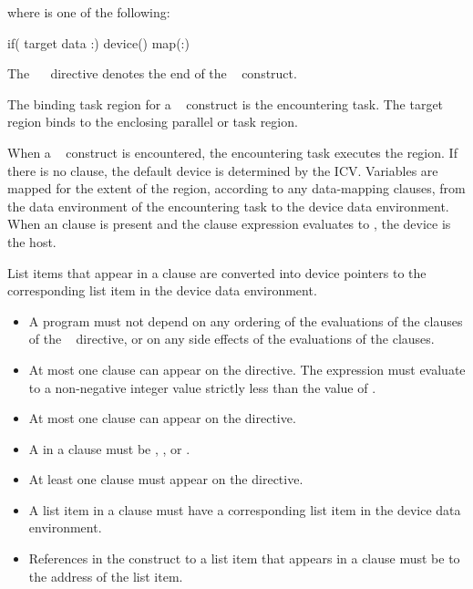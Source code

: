 where  is one of the following:

\begin{indentedcodelist}
if(\plc{[} target data :\plc{] scalar-logical-expression})
device()
map(\plc{[[map-type-modifier[,]] map-type}:\plc{ ] list})
\end{indentedcodelist}

The ~~ directive denotes the end of the ~ construct.
\fortranspecificend

\binding
The binding task region for a ~ construct is the encountering task. The 
target region binds to the enclosing parallel or task region.

\descr
When a ~ construct is encountered, the encountering task executes the region. If there is no  clause, the default device is determined by the  ICV. Variables are mapped for the extent of the region, according to any data-mapping clauses, from the data environment of the encountering task to the device data environment. When an  clause is present and the  clause expression evaluates to , the device is the host.

List items that appear in a  clause are converted into
device pointers to the corresponding list item in the device data environment.

\restrictions
\begin{itemize}
  \item A program must not depend on any ordering of the evaluations of the clauses of the
    ~ directive, or on any side effects of the evaluations of the clauses.

  \item At most one  clause can appear on the directive. The  expression
    must evaluate to a non-negative integer value strictly less than the value
    of .

  \item At most one  clause can appear on the directive.
  \item A  in a  clause must be , ,  or .
  \item At least one  clause must appear on the directive.


  \item A list item in a  clause must have a
    corresponding list item in the device data environment.

  \item References in the construct to a list item that appears in a
     clause must be to the address of the list item.
\end{itemize}

